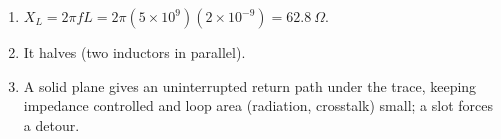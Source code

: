 \begin{enumerate}[leftmargin=1.6em,itemsep=2pt]
\item $X_L = 2\pi f L = 2\pi(5\times10^{9})(2\times10^{-9}) = 62.8\ \Omega$.
\item It halves (two inductors in parallel).
\item A solid plane gives an uninterrupted return path under the trace, keeping impedance controlled and loop area (radiation, crosstalk) small; a slot forces a detour.
\end{enumerate}
